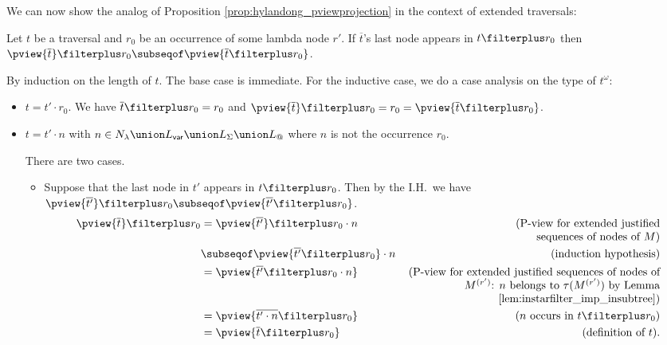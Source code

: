 We can now show the analog of Proposition \ref{prop:hylandong_pviewprojection} in the context of extended traversals:
\begin{proposition}
\label{prop:analog_pviewprojection} Let $t$ be a traversal and $r_0$
be an occurrence of some lambda node $r'$.
If $\overline{t}$'s last node appears in $t\filterplus r_0$ then
 $\pview{ \overline{t}}  \filterplus r_0 \subseqof \pview{ \overline{t}\filterplus
 r_0}$.
\end{proposition}
\proof
By induction on the length of $t$. The base case is immediate. For the inductive case,
we do a case analysis on the type of $t^\omega$:
    \begin{itemize}
    \item $t =  t' \cdot r_0$. We have $\overline{t} \filterplus r_0 = r_0$ and
     $\pview{\overline{t}} \filterplus r_0 = r_0 = \pview{\overline{t} \filterplus r_0}$.

    \item $t = t' \cdot n$ with $n \in N_\lambda \union L_{\sf var} \union
    L_\Sigma \union L_@$ where $n$ is not the occurrence $r_0$.

    There are two cases.
    \begin{itemize}
        \item Suppose that the last node in $t'$ appears in $t\filterplus r_0$. Then
        by the I.H.\ we have $\pview{\overline{t'}} \filterplus  r_0 \subseqof \pview{\overline{t'} \filterplus  r_0}$.
            \begin{align*}
            \pview{\overline{t}} \filterplus r_0
                &=  \pview{\overline{t'}} \filterplus r_0 \cdot n  & \parbox[t]{8cm}{(\raggedleft P-view for extended justified\\sequences of nodes of $M$)} \\
                &\subseqof  \pview{\overline{t'} \filterplus  r_0} \cdot n            & (\mbox{induction hypothesis}) \\
                &=  \pview{\overline{t'} \filterplus  r_0 \cdot n} & \parbox[t]{8cm}{\raggedleft (P-view for extended justified sequences of nodes of $M^{(r')}$: $n$ belongs to $\tau(M^{(r')})$ by Lemma \ref{lem:instarfilter_imp_insubtree})} \\
                &=  \pview{\overline{t' \cdot n} \filterplus  r_0  }   & (\mbox{$n$ occurs in $t\filterplus r_0$}) \\
                &= \pview{\overline{t} \filterplus  r_0  }     & (\mbox{definition of } t).
            \end{align*}


\end{itemize}
\end{itemize}
